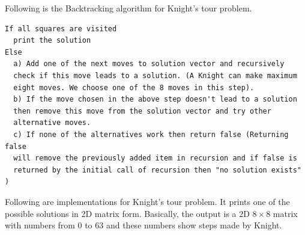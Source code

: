 
Following is the Backtracking algorithm for Knight's tour problem.
\begin{lstlisting}[style=pseudostyle,numbers=none]
If all squares are visited 
  print the solution
Else
  a) Add one of the next moves to solution vector and recursively 
  check if this move leads to a solution. (A Knight can make maximum 
  eight moves. We choose one of the 8 moves in this step).
  b) If the move chosen in the above step doesn't lead to a solution
  then remove this move from the solution vector and try other 
  alternative moves.
  c) If none of the alternatives work then return false (Returning false 
  will remove the previously added item in recursion and if false is 
  returned by the initial call of recursion then "no solution exists" )
\end{lstlisting}
Following are implementations for Knight's tour problem. It prints one of
the possible solutions in 2D matrix form. Basically, the output is a 2D
$8\times 8$ matrix with numbers from $0$ to $63$ and these numbers show
steps made by Knight.
